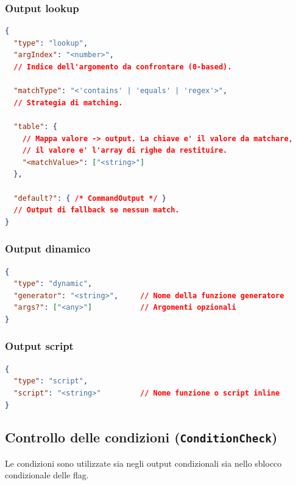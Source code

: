\subsubsection{Output lookup}

\begin{lstlisting}[language=json]
{
  "type": "lookup",
  "argIndex": "<number>",
  // Indice dell'argomento da confrontare (0-based).

  "matchType": "<'contains' | 'equals' | 'regex'>",
  // Strategia di matching.

  "table": {
    // Mappa valore -> output. La chiave e' il valore da matchare,
    // il valore e' l'array di righe da restituire.
    "<matchValue>": ["<string>"]
  },

  "default?": { /* CommandOutput */ }
  // Output di fallback se nessun match.
}
\end{lstlisting}

\subsubsection{Output dinamico}

\begin{lstlisting}[language=json]
{
  "type": "dynamic",
  "generator": "<string>",     // Nome della funzione generatore
  "args?": ["<any>"]           // Argomenti opzionali
}
\end{lstlisting}

\subsubsection{Output script}

\begin{lstlisting}[language=json]
{
  "type": "script",
  "script": "<string>"         // Nome funzione o script inline
}
\end{lstlisting}

\subsection{Controllo delle condizioni (\texttt{ConditionCheck})}

Le condizioni sono utilizzate sia negli output condizionali sia nello sblocco condizionale delle flag.

